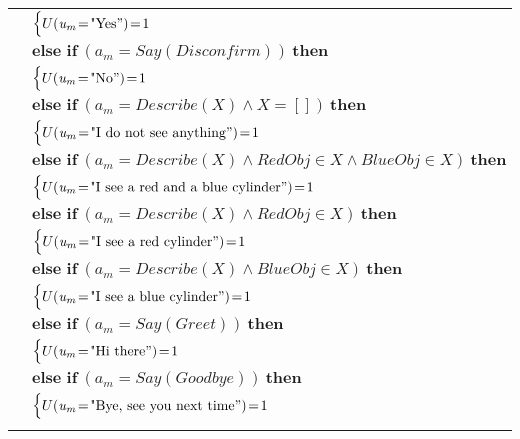\begin{footnotesize}
\begin{longtable}{p{2cm}l}
& \;\;\;\;\; $ \begin{cases}U(\mathit{u_m}\!=\!\text{"Yes}")\!=\!1 \end{cases}$ \vspace{1mm} \\ & $ \textbf{else if} \ (\mathit{a_m}\!=\!\mathit{Say(Disconfirm)}) \ \textbf{then}$ \\
& \;\;\;\;\; $ \begin{cases}U(\mathit{u_m}\!=\!\text{"No}")\!=\!1 \end{cases}$ \vspace{1mm} \\ & $ \textbf{else if} \ (\mathit{a_m}\!=\!\mathit{Describe({X})} \land \mathit{X}\!=\!\mathit{[]}) \ \textbf{then}$ \\
& \;\;\;\;\; $ \begin{cases}U(\mathit{u_m}\!=\!\text{"I do not see anything}")\!=\!1 \end{cases}$ \vspace{1mm} \\ & $ \textbf{else if} \ (\mathit{a_m}\!=\!\mathit{Describe({X})} \land \mathit{RedObj}\!\in\!\mathit{X} \land \mathit{BlueObj}\!\in\!\mathit{X}) \ \textbf{then}$ \\
& \;\;\;\;\; $ \begin{cases}U(\mathit{u_m}\!=\!\text{"I see a red and a blue cylinder}")\!=\!1 \end{cases}$ \vspace{1mm} \\ & $ \textbf{else if} \ (\mathit{a_m}\!=\!\mathit{Describe({X})} \land \mathit{RedObj}\!\in\!\mathit{X}) \ \textbf{then}$ \\
& \;\;\;\;\; $ \begin{cases}U(\mathit{u_m}\!=\!\text{"I see a red cylinder}")\!=\!1 \end{cases}$ \vspace{1mm} \\ & $ \textbf{else if} \ (\mathit{a_m}\!=\!\mathit{Describe({X})} \land \mathit{BlueObj}\!\in\!\mathit{X}) \ \textbf{then}$ \\
& \;\;\;\;\; $ \begin{cases}U(\mathit{u_m}\!=\!\text{"I see a blue cylinder}")\!=\!1 \end{cases}$ \vspace{1mm} \\ & $ \textbf{else if} \ (\mathit{a_m}\!=\!\mathit{Say(Greet)}) \ \textbf{then}$ \\
& \;\;\;\;\; $ \begin{cases}U(\mathit{u_m}\!=\!\text{"Hi there}")\!=\!1 \end{cases}$ \vspace{1mm} \\ & $ \textbf{else if} \ (\mathit{a_m}\!=\!\mathit{Say(Goodbye)}) \ \textbf{then}$ \\
& \;\;\;\;\; $ \begin{cases}U(\mathit{u_m}\!=\!\text{"Bye, see you next time}")\!=\!1 \end{cases}$ \\ \\[-1mm]
\end{longtable}
\end{footnotesize}
